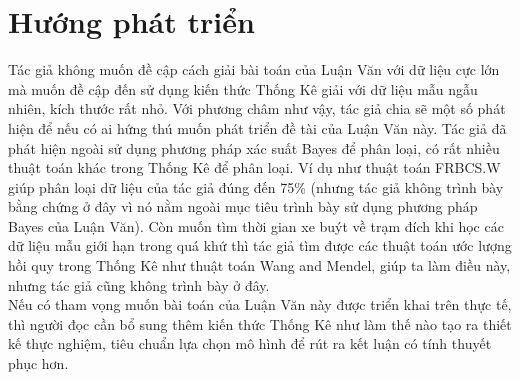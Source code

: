 \documentclass[a4paper, 13pt]{report}
\begin{document}
\section{Hướng phát triển}
Tác giả không muốn đề cập cách giải bài toán của Luận Văn với dữ liệu cực lớn mà muốn đề cập đến sử dụng kiến thức Thống Kê giải với dữ liệu mẫu ngẫu nhiên, kích thước rất nhỏ. Với phương châm như vậy, tác giả chia sẽ một số phát hiện để nếu có ai hứng thú muốn phát triển đề tài của Luận Văn này. Tác giả đã phát hiện ngoài sử dụng phương pháp xác suất Bayes để phân loại, có rất nhiều thuật toán khác trong Thống Kê để phân loại. Ví dụ như thuật toán FRBCS.W giúp phân loại dữ liệu của tác giả đúng đến 75\% (nhưng tác giả không trình bày bằng chứng ở đây vì nó nằm ngoài mục tiêu trình bày sử dụng phương pháp Bayes của Luận Văn). Còn muốn tìm thời gian xe buýt về trạm đích khi học các dữ liệu mẫu giới hạn trong quá khứ thì tác giả tìm được các thuật toán ước lượng hồi quy trong Thống Kê như thuật toán Wang and Mendel, giúp ta làm điều này, nhưng tác giả cũng không trình bày ở đây.\\
Nếu có tham vọng muốn bài toán của Luận Văn này được triển khai trên thực tế, thì người đọc cần bổ sung thêm kiến thức Thống Kê như làm thế nào tạo ra thiết kế thực nghiệm, tiêu chuẩn lựa chọn mô hình để rút ra kết luận có tính thuyết phục hơn.
\pagebreak
\end{document}
